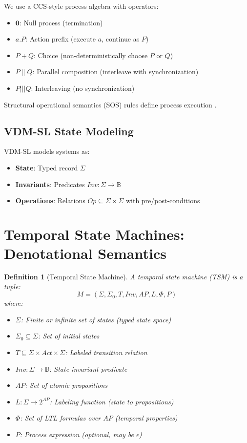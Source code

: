 \documentclass[conference]{IEEEtran}
\newtheorem{definition}{Definition}
\begin{document}
We use a CCS-style process algebra with operators:
\begin{itemize}
\item $\mathbf{0}$: Null process (termination)
\item $a.P$: Action prefix (execute $a$, continue as $P$)
\item $P + Q$: Choice (non-deterministically choose $P$ or $Q$)
\item $P \parallel Q$: Parallel composition (interleave with synchronization)
\item $P \mathbin{|||} Q$: Interleaving (no synchronization)
\end{itemize}

Structural operational semantics (SOS) rules define process execution \cite{milner1989}.

\subsection{VDM-SL State Modeling}

VDM-SL \cite{jones1990} models systems as:
\begin{itemize}
\item \textbf{State}: Typed record $\Sigma$
\item \textbf{Invariants}: Predicates $Inv: \Sigma \to \mathbb{B}$
\item \textbf{Operations}: Relations $Op \subseteq \Sigma \times \Sigma$ with pre/post-conditions
\end{itemize}

\section{Temporal State Machines: Denotational Semantics}
\label{sec:semantics}

\begin{definition}[Temporal State Machine]
A \textit{temporal state machine} (TSM) is a tuple:
\begin{equation}
M = (\Sigma, \Sigma_0, T, Inv, AP, L, \Phi, P)
\end{equation}
where:
\begin{itemize}
\item $\Sigma$: Finite or infinite set of states (typed state space)
\item $\Sigma_0 \subseteq \Sigma$: Set of initial states
\item $T \subseteq \Sigma \times Act \times \Sigma$: Labeled transition relation
\item $Inv: \Sigma \to \mathbb{B}$: State invariant predicate
\item $AP$: Set of atomic propositions
\item $L: \Sigma \to 2^{AP}$: Labeling function (state to propositions)
\item $\Phi$: Set of LTL formulas over $AP$ (temporal properties)
\item $P$: Process expression (optional, may be $\epsilon$)
\end{itemize}
\end{definition}
\end{document}

